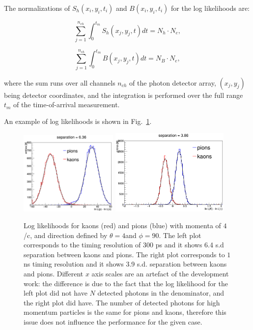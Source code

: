 The normalizations of $S_{h} (x_{i}, y_{i}, t_{i})$ and $B(x_{i}, y_{i}, t_{i})$ for the log likelihoods are:

\begin{equation}
\sum_{j=1}^{n_{ch}} \int_{0}^{t_{m}} S_{h}(x_{j}, y_{j}, t) dt = N_{h}\cdot N_{e},
\label{eq:norm1}
\end{equation}

\begin{equation}
\sum_{j=1}^{n_{ch}} \int_{0}^{t_{m}} B(x_{j}, y_{j}, t) dt = N_{B} \cdot N_{e},
\label{eq:norm2}
\end{equation}

\noindent where the sum runs over all channels $n_{ch}$ of the photon detector array, $(x_{j}, y_{j})$ being detector coordinates, and the integration is performed over the full range $t_{m}$ of the time-of-arrival measurement.

An example of log likelihoods is shown in Fig.~\ref{pic:sepTI}.

\begin{figure}[!h]
\centering
\includegraphics[width=0.43\textwidth]{pics/sepTI300.png} \hspace{0.5cm} \includegraphics[width=0.52\textwidth]{pics/sepTI1000.png}
\caption{\label{pic:sepTI}
Log likelihoods for kaons (red) and pions (blue) with momenta of $4$ {\gev}/c, and direction defined by $\theta = 4$\mydeg and $\phi = 90$\mydeg. The left plot corresponds to the timing resolution of $300$ ps and it shows 6.4 s.d separation between kaons and pions. The right plot corresponds to $1$ ns timing resolution and it shows 3.9 s.d. separation between kaons and pions. \newline \footnotesize{Different $x$ axis scales are an artefact of the development work: the difference is due to the fact that the log likelihood for the left plot did not have $N$ detected photons in the denominator, and the right plot did have. The number of detected photons for high momentum particles is the same for pions and kaons, therefore this issue does not influence the performance for the given case. }
}
\end{figure}

